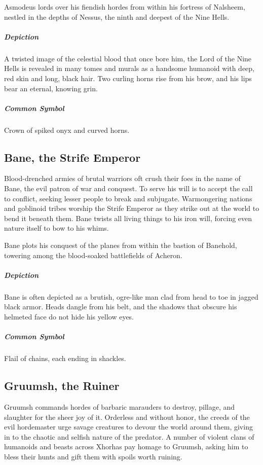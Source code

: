 \documentclass[letterpaper, twocolumn, openany, nodeprecatedcode, layout=true]{dndbook}
\begin{document}
Asmodeus lords over his fiendish hordes from within his fortress of Nalsheem, nestled in the
depths of Nessus, the ninth and deepest of the Nine Hells.

\subparagraph{Depiction}
A twisted image of the celestial blood that once bore him, the Lord of the Nine Hells is
revealed in many tomes and murals as a handsome humanoid with deep, red skin and long,
black hair. Two curling horns rise from his brow, and his lips bear an eternal, knowing grin.

\subparagraph{Common Symbol}
Crown of spiked onyx and curved horns.

\subsection{Bane, the Strife Emperor}

Blood-drenched armies of brutal warriors oft crush their foes in the name of Bane, the evil
patron of war and conquest. To serve his will is to accept the call to conflict, seeking
lesser people to break and subjugate. Warmongering nations and goblinoid tribes worship the
Strife Emperor as they strike out at the world to bend it beneath them. Bane twists all
living things to his iron will, forcing even nature itself to bow to his whims.

Bane plots his conquest of the planes from within the bastion of Banehold, towering among
the blood-soaked battlefields of Acheron.

\subparagraph{Depiction}
Bane is often depicted as a brutish, ogre-like man clad from head to toe in jagged black armor.
Heads dangle from his belt, and the shadows that obscure his helmeted face do not hide his
yellow eyes.

\subparagraph{Common Symbol}
Flail of chains, each ending in shackles.

\subsection{Gruumsh, the Ruiner}

Gruumsh commands hordes of barbaric marauders to destroy, pillage, and slaughter for the sheer
joy of it. Orderless and without honor, the creeds of the evil hordemaster urge savage
creatures to devour the world around them, giving in to the chaotic and selfish nature of
the predator. A number of violent clans of humanoids and beasts across Xhorhas pay homage to
Gruumsh, asking him to bless their hunts and gift them with spoils worth ruining.
\end{document}
